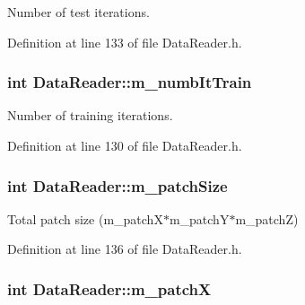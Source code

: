 Number of test iterations. 



Definition at line 133 of file Data\+Reader.\+h.

\subsubsection[{\texorpdfstring{m\+\_\+numb\+It\+Train}{m_numbItTrain}}]{\setlength{\rightskip}{0pt plus 5cm}int Data\+Reader\+::m\+\_\+numb\+It\+Train\hspace{0.3cm}{\ttfamily [private]}}\hypertarget{classDataReader_a1a78f7b37cb3908c3db5ee4538c2c932}{}\label{classDataReader_a1a78f7b37cb3908c3db5ee4538c2c932}


Number of training iterations. 



Definition at line 130 of file Data\+Reader.\+h.

\subsubsection[{\texorpdfstring{m\+\_\+patch\+Size}{m_patchSize}}]{\setlength{\rightskip}{0pt plus 5cm}int Data\+Reader\+::m\+\_\+patch\+Size\hspace{0.3cm}{\ttfamily [private]}}\hypertarget{classDataReader_a9ae84cb0ea7dd165616880737280e6b6}{}\label{classDataReader_a9ae84cb0ea7dd165616880737280e6b6}


Total patch size (m\+\_\+patch\+X$\ast$m\+\_\+patch\+Y$\ast$m\+\_\+patchZ) 



Definition at line 136 of file Data\+Reader.\+h.

\subsubsection[{\texorpdfstring{m\+\_\+patchX}{m_patchX}}]{\setlength{\rightskip}{0pt plus 5cm}int Data\+Reader\+::m\+\_\+patchX\hspace{0.3cm}{\ttfamily [private]}}\hypertarget{classDataReader_a95d075ccc3b12ec30a97d6664642efc2}{}\label{classDataReader_a95d075ccc3b12ec30a97d6664642efc2}


